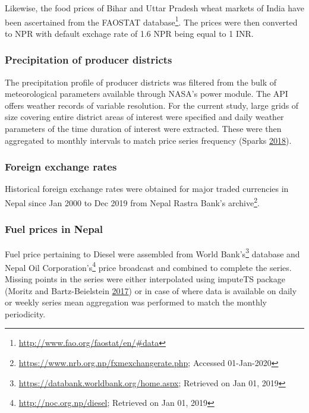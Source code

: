 \documentclass[12pt,]{article}
\begin{document}
Likewise, the food prices of Bihar and Uttar Pradesh wheat markets of India have been ascertained from the FAOSTAT database\footnote{\url{http://www.fao.org/faostat/en/\#data}}. The prices were then converted to NPR with default exchage rate of 1.6 NPR being equal to 1 INR.

\hypertarget{precipitation-of-producer-districts}{%
\subsubsection{Precipitation of producer districts}\label{precipitation-of-producer-districts}}

The precipitation profile of producer districts was filtered from the bulk of meteorological parameters available through NASA's power module. The API offers weather records of variable resolution. For the current study, large grids of size covering entire district areas of interest were specified and daily weather parameters of the time duration of interest were extracted. These were then aggregated to monthly intervals to match price series frequency (Sparks \protect\hyperlink{ref-nasapowerr2019}{2018}).

\hypertarget{foreign-exchange-rates-1}{%
\subsubsection{Foreign exchange rates}\label{foreign-exchange-rates-1}}

Historical foreign exchange rates were obtained for major traded currencies in Nepal since Jan 2000 to Dec 2019 from Nepal Rastra Bank's archive\footnote{\url{https://www.nrb.org.np/fxmexchangerate.php}; Accessed 01-Jan-2020}.

\hypertarget{fuel-prices-in-nepal}{%
\subsubsection{Fuel prices in Nepal}\label{fuel-prices-in-nepal}}

Fuel price pertaining to Diesel were assembled from World Bank's\footnote{\url{https://databank.worldbank.org/home.aspx}; Retrieved on Jan 01, 2019} database and Nepal Oil Corporation's\footnote{\url{http://noc.org.np/diesel}; Retrieved on Jan 01, 2019} price broadcast and combined to complete the series. Missing points in the series were either interpolated using imputeTS package (Moritz and Bartz-Beielstein \protect\hyperlink{ref-tsmissingvalueimpute2017}{2017}) or in case of where data is available on daily or weekly series mean aggregation was performed to match the monthly periodicity.
\end{document}

